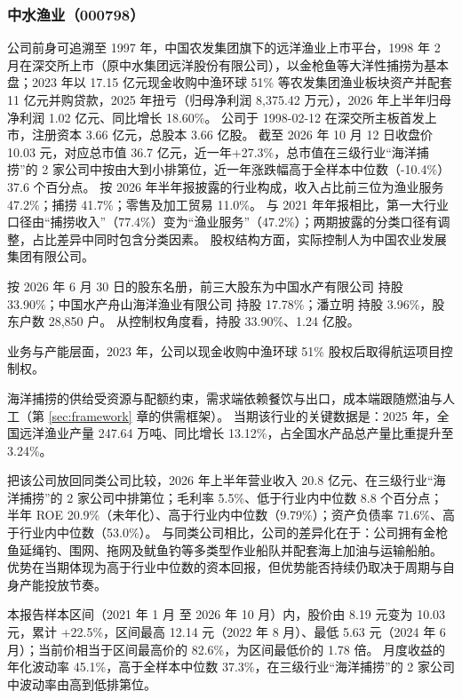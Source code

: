 \subsubsection{中水渔业（000798）}
\label{co:000798}

 公司前身可追溯至 1997 年，中国农发集团旗下的远洋渔业上市平台，1998 年 2 月在深交所上市（原中水集团远洋股份有限公司），以金枪鱼等大洋性捕捞为基本盘；2023 年以 17.15 亿元现金收购中渔环球 51\% 等农发集团渔业板块资产并配套 11 亿元并购贷款，2025 年扭亏（归母净利润 8,375.42 万元），2026 年上半年归母净利润 1.02 亿元、同比增长 18.60\%。 公司于 1998-02-12 在深交所主板首发上市，注册资本 3.66 亿元，总股本 3.66 亿股。 截至 2026 年 10 月 12 日收盘价 10.03 元，对应总市值 36.7 亿元，近一年+27.3\%，总市值在三级行业“海洋捕捞”的 2 家公司中按由大到小排第位，近一年涨跌幅高于全样本中位数（-10.4\%）37.6 个百分点。 按 2026 年半年报披露的行业构成，收入占比前三位为渔业服务 47.2\%；捕捞 41.7\%；零售及加工贸易 11.0\%。 与 2021 年年报相比，第一大行业口径由“捕捞收入”（77.4\%）变为“渔业服务”（47.2\%）；两期披露的分类口径有调整，占比差异中同时包含分类因素。 股权结构方面，实际控制人为中国农业发展集团有限公司。

 按 2026 年 6 月 30 日的股东名册，前三大股东为中国水产有限公司 持股 33.90\%；中国水产舟山海洋渔业有限公司 持股 17.78\%；潘立明 持股 3.96\%，股东户数 28,850 户。 从控制权角度看，持股 33.90\%、1.24 亿股。

 业务与产能层面，2023 年，公司以现金收购中渔环球 51\% 股权后取得航运项目控制权。

 海洋捕捞的供给受资源与配额约束，需求端依赖餐饮与出口，成本端跟随燃油与人工（第 \ref{sec:framework} 章的供需框架）。 当期该行业的关键数据是：2025 年，全国远洋渔业产量 247.64 万吨、同比增长 13.12\%，占全国水产品总产量比重提升至 3.24\%。

 把该公司放回同类公司比较，2026 年上半年营业收入 20.8 亿元、在三级行业“海洋捕捞”的 2 家公司中排第位；毛利率 5.5\%、低于行业内中位数 8.8 个百分点；半年 ROE 20.9\%（未年化）、高于行业内中位数（9.79\%）；资产负债率 71.6\%、高于行业内中位数（53.0\%）。 与同类公司相比，公司的差异化在于：公司拥有金枪鱼延绳钓、围网、拖网及鱿鱼钓等多类型作业船队并配套海上加油与运输船舶。 优势在当期体现为高于行业中位数的资本回报，但优势能否持续仍取决于周期与自身产能投放节奏。

 本报告样本区间（2021 年 1 月 至 2026 年 10 月）内，股价由 8.19 元变为 10.03 元，累计 +22.5\%，区间最高 12.14 元（2022 年 8 月）、最低 5.63 元（2024 年 6 月）；当前价相当于区间最高价的 82.6\%，为区间最低价的 1.78 倍。 月度收益的年化波动率 45.1\%，高于全样本中位数 37.3\%，在三级行业“海洋捕捞”的 2 家公司中波动率由高到低排第位。

